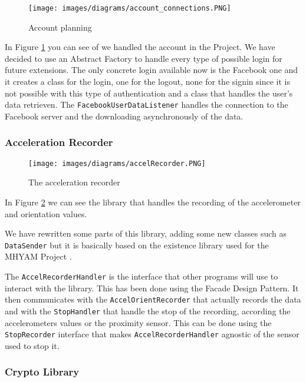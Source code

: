 \begin{figure}[H]
\centering %
\texttt{[image: images/diagrams/account\_connections.PNG]}
\caption{Account planning}
\label{fig:accountPlanning}
\end{figure}

In Figure \ref{fig:accountPlanning} you can see of we handled the account in the Project. We have decided to use an Abstract Factory to handle every type of possible login for future extensions. The only concrete login available now is the Facebook one and it creates a class for the login, one for the logout, none for the signin since it is not possible with this type of authentication and a class that handles the user's data retrieven. The \texttt{FacebookUserDataListener} handles the connection to the Facebook server and the downloading asynchronously of the data.

\subsubsection{Acceleration Recorder}

\begin{figure}[H]
\centering %
\texttt{[image: images/diagrams/accelRecorder.PNG]}
\caption{The acceleration recorder}
\label{fig:accelRecorder}
\end{figure}

In Figure \ref{fig:accelRecorder} we can see the library that handles the recording of the accelerometer and orientation values.

We have rewritten some parts of this library, adding some new classes such as \texttt{DataSender} but it is basically based on the existence library used for the MHYAM Project \cite{MHYAM}.

The \texttt{AccelRecorderHandler} is the interface that other programs will use to interact with the library. This has been done using the Facade Design Pattern. It then communicates with the \texttt{AccelOrientRecorder} that actually records the data and with the \texttt{StopHandler} that handle the stop of the recording, according the accelerometers values or the proximity sensor. This can be done using the \texttt{StopRecorder} interface that makes \texttt{AccelRecorderHandler} agnostic of the sensor used to stop it.

\subsubsection{Crypto Library}

